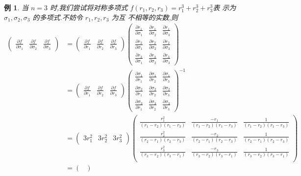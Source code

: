 \documentclass[a4paper]{article}
\newtheorem{example}{例}[section]
\newcommand{\pa}{\partial} \newcommand{\Om}{\Omega}
\begin{document}
\begin{example}
  当 $n=3$ 时,我们尝试将对称多项式 $f(r_1,r_2,r_3)=r_1^3+r_2^3+r_3^3$表
  示为 $\sigma_1,\sigma_2,\sigma_3$ 的多项式.不妨令 $r_1,r_2,r_3$ 为互
  不相等的实数,则
\begin{align*}
  \begin{pmatrix}
    \frac{\pa f}{\pa \sigma_1}&\frac{\pa f}{\pa \sigma_2}&\frac{\pa
      f}{\pa \sigma_3}
  \end{pmatrix}&=\begin{pmatrix} \frac{\pa f}{\pa r_1}&\frac{\pa
      f}{\pa r_2}&\frac{\pa f}{\pa r_3}
  \end{pmatrix}\begin{pmatrix}
    \frac{\pa r_1}{\pa \sigma_1}&\frac{\pa r_1}{\pa
      \sigma_2}&\frac{\pa
      r_1}{\pa \sigma_3}\\
    \frac{\pa r_2}{\pa \sigma_1}&\frac{\pa r_2}{\pa
      \sigma_2}&\frac{\pa
      r_2}{\pa \sigma_3}\\
    \frac{\pa r_3}{\pa \sigma_1}&\frac{\pa r_3}{\pa
      \sigma_2}&\frac{\pa r_3}{\pa \sigma_3}
  \end{pmatrix}\\&=\begin{pmatrix}
    \frac{\pa f}{\pa r_1}&\frac{\pa f}{\pa r_2}&\frac{\pa f}{\pa r_3}
  \end{pmatrix}\begin{pmatrix}
    \frac{\pa \sigma_1}{\pa r_1}&\frac{\pa \sigma_1}{\pa
      r_2}&\frac{\pa \sigma_1}{\pa r_3}\\
\frac{\pa \sigma_2}{\pa r_1}&\frac{\pa \sigma_2}{\pa r_2}&\frac{\pa
  \sigma_2}{\pa r_3}\\
\frac{\pa\sigma_3}{\pa r_1}&\frac{\pa \sigma_3}{\pa r_2}&\frac{\pa
  \sigma_3}{\pa r_3}
  \end{pmatrix}^{-1}\\&=\begin{pmatrix}
    3r_1^2&3r_2^2&3r_3^2
  \end{pmatrix}\begin{pmatrix}
  \frac{r_1^2}{(r_1-r_2)(r_1-r_3)}&\frac{-r_1}{(r_1-r_2)(r_1-r_3)}&\frac{1}{(r_1-r_2)(r_1-r_3)}\\
  \frac{r_2^2}{(r_2-r_1)(r_2-r_3)}&\frac{-r_2}{(r_2-r_1)(r_2-r_3)}&\frac{1}{(r_2-r_1)(r_2-r_3)}\\
  \frac{r_3^2}{(r_3-r_2)(r_3-r_1)}&\frac{-r_3}{(r_3-r_2)(r_3-r_1)}&\frac{1}{(r_3-r_2)(r_3-r_1)}\\      
  \end{pmatrix}\\&=\begin{pmatrix}

\end{pmatrix}
\end{align*}
\end{example}
\end{document}
